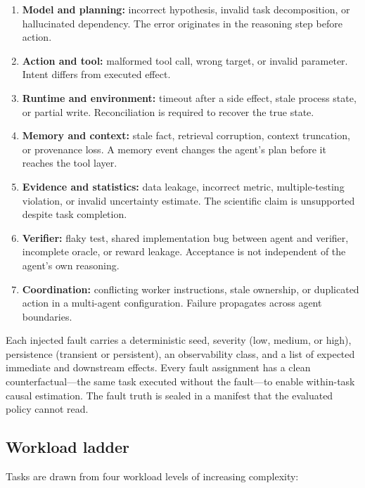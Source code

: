 \begin{enumerate}
    \item \textbf{Model and planning:} incorrect hypothesis, invalid task
          decomposition, or hallucinated dependency. The error originates in
          the reasoning step before action.
    \item \textbf{Action and tool:} malformed tool call, wrong target, or
          invalid parameter. Intent differs from executed effect.
    \item \textbf{Runtime and environment:} timeout after a side effect,
          stale process state, or partial write. Reconciliation is required
          to recover the true state.
    \item \textbf{Memory and context:} stale fact, retrieval corruption,
          context truncation, or provenance loss. A memory event changes the
          agent's plan before it reaches the tool layer.
    \item \textbf{Evidence and statistics:} data leakage, incorrect metric,
          multiple-testing violation, or invalid uncertainty estimate. The
          scientific claim is unsupported despite task completion.
    \item \textbf{Verifier:} flaky test, shared implementation bug between
          agent and verifier, incomplete oracle, or reward leakage.
          Acceptance is not independent of the agent's own reasoning.
    \item \textbf{Coordination:} conflicting worker instructions, stale
          ownership, or duplicated action in a multi-agent configuration.
          Failure propagates across agent boundaries.
\end{enumerate}

Each injected fault carries a deterministic seed, severity (low, medium, or
high), persistence (transient or persistent), an observability class, and a
list of expected immediate and downstream effects. Every fault assignment
has a clean counterfactual—the same task executed without the fault—to
enable within-task causal estimation. The fault truth is sealed in a
manifest that the evaluated policy cannot read.

\subsection{Workload ladder}

Tasks are drawn from four workload levels of increasing complexity:

